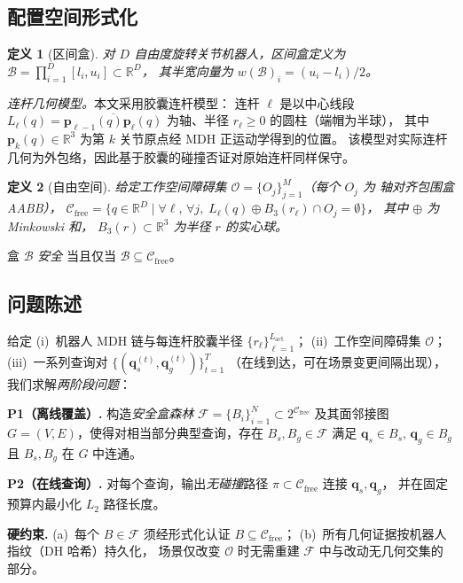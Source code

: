 \documentclass[journal]{IEEEtran}
\newtheorem{definition}{定义}
\newcommand{\Real}{\mathbb{R}}
\newcommand{\Cfree}{\mathcal{C}_{\mathrm{free}}}
\newcommand{\calO}{\mathcal{O}}
\begin{document}
\subsection{配置空间形式化}

\begin{definition}[区间盒]
对 $D$ 自由度旋转关节机器人，\emph{区间盒}定义为
$\mathcal{B} = \prod_{i=1}^{D}[l_i, u_i] \subset \Real^D$，
其半宽向量为 $w(\mathcal{B})_i = (u_i-l_i)/2$。
\end{definition}

\emph{连杆几何模型。}本文采用胶囊连杆模型：
连杆 $\ell$ 是以中心线段
$L_\ell(q)=\overline{\bm{p}_{\ell-1}(q)\bm{p}_\ell(q)}$
为轴、半径 $r_\ell\geq 0$ 的圆柱（端帽为半球），
其中 $\bm{p}_k(q)\in\Real^3$ 为第 $k$ 关节原点经 MDH 正运动学得到的位置。
该模型对实际连杆几何为外包络，因此基于胶囊的碰撞否证对原始连杆同样保守。

\begin{definition}[自由空间]\label{def:cfree}
给定工作空间障碍集 $\calO = \{O_j\}_{j=1}^{M}$（每个 $O_j$ 为
轴对齐包围盒 AABB），
$\Cfree = \{q \in \Real^D \mid \forall \ell,\,\forall j,\;
L_\ell(q) \oplus B_3(r_\ell) \cap O_j = \emptyset\}$，
其中 $\oplus$ 为 Minkowski 和，
$B_3(r)\subset\Real^3$ 为半径 $r$ 的实心球。
\end{definition}

盒 $\mathcal{B}$ \emph{安全} 当且仅当 $\mathcal{B} \subseteq \Cfree$。

\subsection{问题陈述}\label{sec:problem}

给定 (i)~机器人 MDH 链与每连杆胶囊半径 $\{r_\ell\}_{\ell=1}^{L_\text{act}}$；
(ii)~工作空间障碍集 $\calO$；
(iii)~一系列查询对 $\{(\bm{q}_s^{(t)},\bm{q}_g^{(t)})\}_{t=1}^{T}$
（在线到达，可在场景变更间隔出现），
我们求解\emph{两阶段问题}：

\textbf{P1（离线覆盖）.}
构造\emph{安全盒森林}
$\mathcal{F}=\{B_i\}_{i=1}^{N}\subset 2^{\Cfree}$ 及其面邻接图
$G=(V,E)$，使得对相当部分典型查询，存在
$B_s,B_g\in\mathcal{F}$ 满足 $\bm{q}_s\in B_s,\,\bm{q}_g\in B_g$ 且
$B_s,B_g$ 在 $G$ 中连通。

\textbf{P2（在线查询）.}
对每个查询，输出\emph{无碰撞}路径
$\pi\subset\Cfree$ 连接 $\bm{q}_s,\bm{q}_g$，
并在固定预算内最小化 $L_2$ 路径长度。

\textbf{硬约束.} (a)~每个 $B\in\mathcal{F}$ 须经形式化认证 $B\subseteq\Cfree$；
(b)~所有几何证据按机器人指纹（DH 哈希）持久化，
场景仅改变 $\calO$ 时无需重建 $\mathcal{F}$ 中与改动无几何交集的部分。
\end{document}
